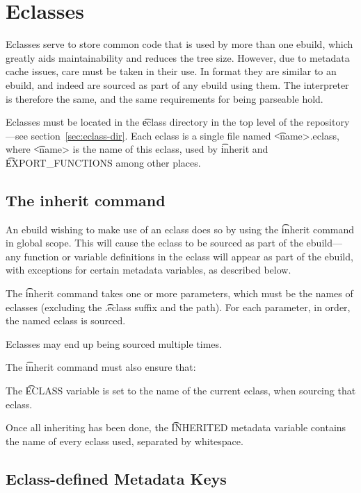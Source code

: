 \chapter{Eclasses}
\label{sec:eclasses}

Eclasses serve to store common code that is used by more than one ebuild, which greatly aids
maintainability and reduces the tree size. However, due to metadata cache issues, care must be taken
in their use. In format they are similar to an ebuild, and indeed are sourced as part of any ebuild
using them. The interpreter is therefore the same, and the same requirements for being parseable
hold.

Eclasses must be located in the \t{eclass} directory in the top level of the repository---see
section~\ref{sec:eclass-dir}. Each eclass is a single file named \t{<name>.eclass}, where \t{<name>} is
the name of this eclass, used by \t{inherit} and \t{EXPORT\_FUNCTIONS} among other places.

\section{The inherit command}
\label{sec:inherit}

An ebuild wishing to make use of an eclass does so by using the \t{inherit} command in global scope.
This will cause the eclass to be sourced as part of the ebuild---any function or variable
definitions in the eclass will appear as part of the ebuild, with exceptions for certain metadata
variables, as described below.

The \t{inherit} command takes one or more parameters, which must be the names of eclasses (excluding
the \t{.eclass} suffix and the path). For each parameter, in order, the named eclass is sourced.

Eclasses may end up being sourced multiple times.

The \t{inherit} command must also ensure that:

\begin{compactitem}
\item The \t{ECLASS} variable is set to the name of the current eclass, when sourcing that eclass.
\item Once all inheriting has been done, the \t{INHERITED} metadata variable contains the name of
    every eclass used, separated  by whitespace.
\end{compactitem}

\section{Eclass-defined Metadata Keys}


